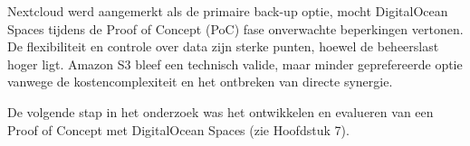 Nextcloud werd aangemerkt als de primaire back-up optie, mocht DigitalOcean Spaces tijdens de Proof of Concept (PoC) fase onverwachte beperkingen vertonen. De flexibiliteit en controle over data zijn sterke punten, hoewel de beheerslast hoger ligt. Amazon S3 bleef een technisch valide, maar minder geprefereerde optie vanwege de kostencomplexiteit en het ontbreken van directe synergie.

De volgende stap in het onderzoek was het ontwikkelen en evalueren van een Proof of Concept met DigitalOcean Spaces (zie Hoofdstuk 7).